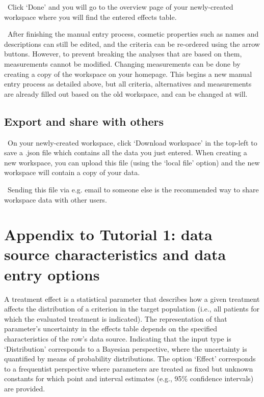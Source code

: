 \documentclass[00_mcda_tutorial.tex]{subfiles}
\begin{document}
\noindent \leftpointright \, Click ‘Done’ and you will go to the overview page of your newly-created workspace where you will find the entered effects table.
\newline

\noindent \faGraduationCap \, After finishing the manual entry process, cosmetic properties such as names and descriptions can still be edited, and the criteria can be re-ordered using the arrow buttons. However, to prevent breaking the analyses that are based on them, measurements cannot be modified. Changing measurements can be done by creating a copy of the workspace on your homepage. This begins a new manual entry process as detailed above, but all criteria, alternatives and measurements are already filled out based on the old workspace, and can be changed at will.

\subsection*{Export and share with others}
\noindent \leftpointright \, On your newly-created workspace, click ‘Download workspace’ in the top-left to save a .json file which contains all the data you just entered. When creating a new workspace, you can upload this file (using the ‘local file’ option) and the new workspace will contain a copy of your data.
\newline

\noindent \faLightbulbO \, Sending this file via e.g. email to someone else is the recommended way to share workspace data with other users.
\clearpage

\section*{Appendix to Tutorial 1: data source characteristics and data entry options}
\label{appendix1}
A treatment effect is a statistical parameter that describes how a given treatment affects the distribution of a criterion in the target population (i.e., all patients for which the evaluated treatment is indicated). The representation of that parameter’s uncertainty in the effects table depends on the specified characteristics of the row’s data source. Indicating that the input type is ‘Distribution’ corresponds to a Bayesian perspective, where the uncertainty is quantified by means of probability distributions. The option ‘Effect’ corresponds to a frequentist perspective where parameters are treated as fixed but unknown constants for which point and interval estimates (e.g., 95\% confidence intervals) are provided.
\end{document}
